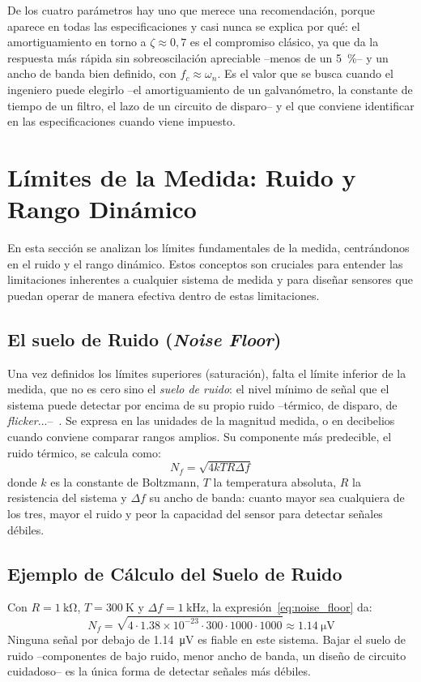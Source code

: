De los cuatro parámetros hay uno que merece una recomendación, porque aparece en todas las especificaciones y casi nunca se explica por qué: el amortiguamiento en torno a $\zeta \approx 0{,}7$ es el compromiso clásico, ya que da la respuesta más rápida sin sobreoscilación apreciable --menos de un \SI{5}{\percent}-- y un ancho de banda bien definido, con $f_c \approx \omega_n$. Es el valor que se busca cuando el ingeniero puede elegirlo --el amortiguamiento de un galvanómetro, la constante de tiempo de un filtro, el lazo de un circuito de disparo-- y el que conviene identificar en las especificaciones cuando viene impuesto.

\section{Límites de la Medida: Ruido y Rango Dinámico}\label{sec:limites_medida}

En esta sección se analizan los límites fundamentales de la medida, centrándonos en el ruido y el rango dinámico. Estos conceptos son cruciales para entender las limitaciones inherentes a cualquier sistema de medida y para diseñar sensores que puedan operar de manera efectiva dentro de estas limitaciones.

\subsection{El suelo de Ruido (\textit{Noise Floor})}\label{sec:noise_floor}
Una vez definidos los límites superiores (saturación), falta el límite inferior de la medida, que no es cero sino el \emph{suelo de ruido}: el nivel mínimo de señal que el sistema puede detectar por encima de su propio ruido --térmico, de disparo, de \textit{flicker}...--~\cite{ott1988noise}. Se expresa en las unidades de la magnitud medida, o en decibelios cuando conviene comparar rangos amplios. Su componente más predecible, el ruido térmico, se calcula como:
\begin{equation}\label{eq:noise_floor}
    N_f = \sqrt{4 k T R \Delta f}
\end{equation}
donde $k$ es la constante de Boltzmann, $T$ la temperatura absoluta, $R$ la resistencia del sistema y $\Delta f$ su ancho de banda: cuanto mayor sea cualquiera de los tres, mayor el ruido y peor la capacidad del sensor para detectar señales débiles.

\subsection{Ejemplo de Cálculo del Suelo de Ruido}\label{sec:ejemplo_suelo_ruido}
Con $R = \SI{1}{\kilo\ohm}$, $T = \SI{300}{\kelvin}$ y $\Delta f = \SI{1}{\kilo\hertz}$, la expresión~\eqref{eq:noise_floor} da:
\begin{equation}\label{eq:ejemplo_suelo_ruido}
    N_f = \sqrt{4 \cdot 1.38 \times 10^{-23} \cdot 300 \cdot 1000 \cdot 1000} \approx \SI{1.14}{\micro\volt}
\end{equation}
Ninguna señal por debajo de \SI{1.14}{\micro\volt} es fiable en este sistema. Bajar el suelo de ruido --componentes de bajo ruido, menor ancho de banda, un diseño de circuito cuidadoso-- es la única forma de detectar señales más débiles.

